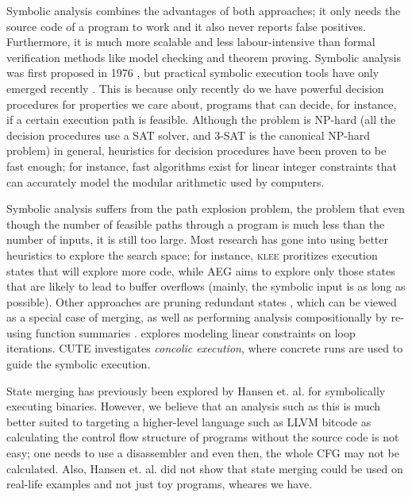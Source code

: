 \documentclass[12pt,a4paper]{article}
\newcommand{\klee}{\textsc{klee }}
\begin{document}
Symbolic analysis combines the advantages of both approaches; it only needs the source code of a program to work and it also never reports false positives. Furthermore, it is much more scalable and less labour-intensive than formal verification methods like model checking and theorem proving. Symbolic analysis was first proposed in 1976 \cite{old}, but practical symbolic execution tools have only emerged recently \cite{klee}\cite{dart}. This is because only recently do we have powerful decision procedures \cite{bitvecarray} for properties we care about, programs that can decide, for instance, if a certain execution path is feasible. Although the problem is NP-hard (all the decision procedures use a SAT solver, and 3-SAT is the canonical NP-hard problem) in general, heuristics for decision procedures have been proven to be fast enough; for instance, fast algorithms exist for linear integer constraints that can accurately model the modular arithmetic used by computers.

Symbolic analysis suffers from the path explosion problem, the problem that even though the number of feasible paths through a program is much less than the number of inputs, it is still too large. Most research has gone into using better heuristics to explore the search space; for instance, \klee proritizes execution states that will explore more code, while AEG \cite{aeg} aims to explore only those states that are likely to lead to buffer overflows (mainly, the symbolic input is as long as possible). Other approaches are pruning redundant states \cite{rwset}, which can be viewed as a special case of merging, as well as performing analysis compositionally by re-using function summaries \cite{cdtg}. \cite{loopsum} explores modeling linear constraints on loop iterations. CUTE \cite{cute} investigates \emph{concolic execution}, where concrete runs are used to guide the symbolic execution.

State merging has previously been explored by Hansen et. al. \cite{statejoin} for symbolically executing binaries. However, we believe that an analysis such as this is much better suited to targeting a higher-level language such as LLVM bitcode as calculating the control flow structure of programs without the source code is not easy; one needs to use a disassembler and even then, the whole CFG may not be calculated. Also, Hansen et. al. did not show that state merging could be used on real-life examples and not just toy programs, wheares we have.
\end{document}
